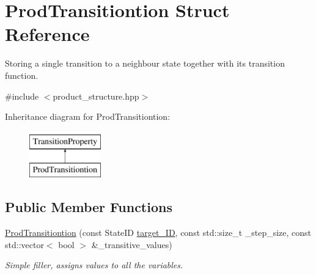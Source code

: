\hypertarget{structProdTransitiontion}{\section{\-Prod\-Transitiontion \-Struct \-Reference}
\label{structProdTransitiontion}
}


\-Storing a single transition to a neighbour state together with its transition function.  




{\ttfamily \#include $<$product\-\_\-structure.\-hpp$>$}

\-Inheritance diagram for \-Prod\-Transitiontion\-:\begin{figure}[H]
\begin{center}
\leavevmode
\includegraphics[height=2.000000cm]{structProdTransitiontion}
\end{center}
\end{figure}
\subsection*{\-Public \-Member \-Functions}
\begin{DoxyCompactItemize}
\item 
\hypertarget{structProdTransitiontion_aa349b7a418a751f818175eb0f73eac17}{\hyperlink{structProdTransitiontion_aa349b7a418a751f818175eb0f73eac17}{\-Prod\-Transitiontion} (const \-State\-I\-D \hyperlink{structTransitionProperty_a1e272cf5a26a0db442ac0fed5b797386}{target\-\_\-\-I\-D}, const std\-::size\-\_\-t \-\_\-step\-\_\-size, const std\-::vector$<$ bool $>$ \&\-\_\-transitive\-\_\-values)}\label{structProdTransitiontion_aa349b7a418a751f818175eb0f73eac17}

\begin{DoxyCompactList}\small\item\em \-Simple filler, assigns values to all the variables. \end{DoxyCompactList}\end{DoxyCompactItemize}
